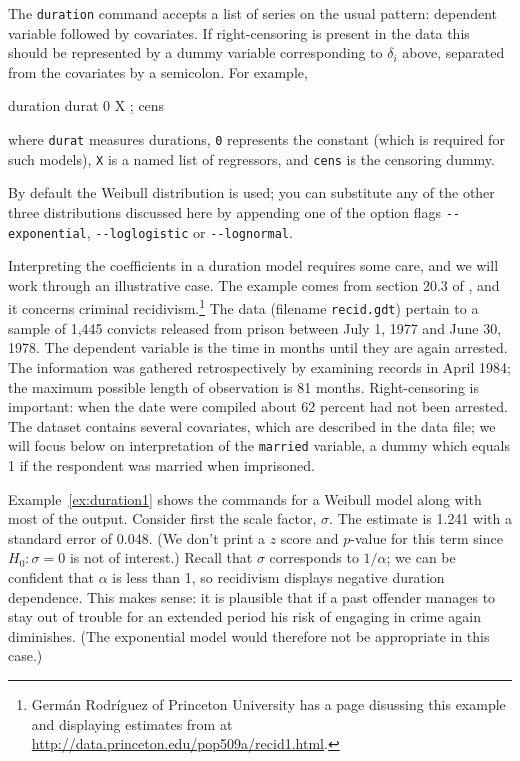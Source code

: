 The \texttt{duration} command accepts a list of series on the usual
pattern: dependent variable followed by covariates. If right-censoring
is present in the data this should be represented by a dummy variable
corresponding to $\delta_i$ above, separated from the covariates by
a semicolon. For example,
\begin{code}
duration durat 0 X ; cens
\end{code}
where \texttt{durat} measures durations, \texttt{0} represents the
constant (which is required for such models), \texttt{X} is a named
list of regressors, and \texttt{cens} is the censoring dummy.

By default the Weibull distribution is used; you can substitute any of
the other three distributions discussed here by appending one of the
option flags \verb|--exponential|, \verb|--loglogistic| or 
\verb|--lognormal|.

Interpreting the coefficients in a duration model requires some care,
and we will work through an illustrative case. The example comes from
section 20.3 of \cite{wooldridge-panel}, and it concerns criminal
recidivism.\footnote{Germ\'an Rodr\'iguez of Princeton University has a
  page disussing this example and displaying estimates from
   at \url{http://data.princeton.edu/pop509a/recid1.html}.}
The data (filename \texttt{recid.gdt}) pertain to a sample of 1,445
convicts released from prison between July 1, 1977 and June 30,
1978. The dependent variable is the time in months until they are
again arrested. The information was gathered retrospectively by
examining records in April 1984; the maximum possible length of
observation is 81 months.  Right-censoring is important: when the date
were compiled about 62 percent had not been arrested.  The dataset
contains several covariates, which are described in the data file; we
will focus below on interpretation of the \texttt{married} variable, a
dummy which equals 1 if the respondent was married when imprisoned.

Example~\ref{ex:duration1} shows the  commands for a
Weibull model along with most of the output.  Consider first the scale
factor, $\sigma$. The estimate is 1.241 with a standard error of
0.048.  (We don't print a $z$ score and $p$-value for this term since
$H_0: \sigma = 0$ is not of interest.)  Recall that $\sigma$
corresponds to $1/\alpha$; we can be confident that $\alpha$ is less
than 1, so recidivism displays negative duration dependence.  This
makes sense: it is plausible that if a past offender manages to stay
out of trouble for an extended period his risk of engaging in crime
again diminishes. (The exponential model would therefore not be
appropriate in this case.)

